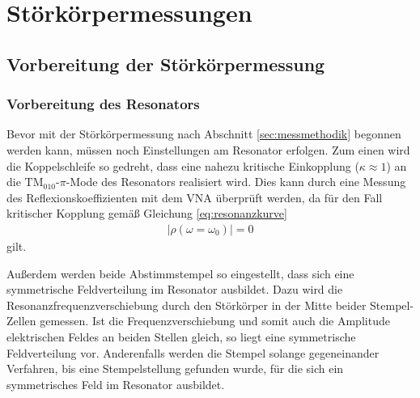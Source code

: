 \chapter{Störkörpermessungen}
\label{sec:stoerkoerpermessung}


\section{Vorbereitung der Störkörpermessung}

\subsection{Vorbereitung des Resonators}
\label{sec:vorbereitung_resonator}
Bevor mit der Störkörpermessung nach Abschnitt \ref{sec:messmethodik} begonnen werden kann, müssen noch Einstellungen am Resonator erfolgen.
Zum einen wird die Koppelschleife so gedreht, dass eine nahezu kritische Einkopplung ($\kappa \approx 1$) an die $\mathrm{TM}_{010}\text{-}\pi$-Mode des Resonators realisiert wird.
Dies kann durch eine Messung des Reflexionskoeffizienten mit dem VNA überprüft werden, da für den Fall kritischer Kopplung gemäß Gleichung \eqref{eq:resonanzkurve}
\begin{align}
	|\rho(\omega = \omega_0)| = 0
\end{align}
gilt.

Außerdem werden beide Abstimmstempel so eingestellt, dass sich eine symmetrische Feldverteilung im Resonator ausbildet.
Dazu wird die Resonanzfrequenzverschiebung durch den Störkörper in der Mitte beider Stempel-Zellen gemessen.
Ist die Frequenzverschiebung und somit auch die Amplitude elektrischen Feldes an beiden Stellen gleich, so liegt eine symmetrische Feldverteilung vor.
Anderenfalls werden die Stempel solange gegeneinander Verfahren, bis eine Stempelstellung gefunden wurde, für die sich ein symmetrisches Feld im Resonator ausbildet.

